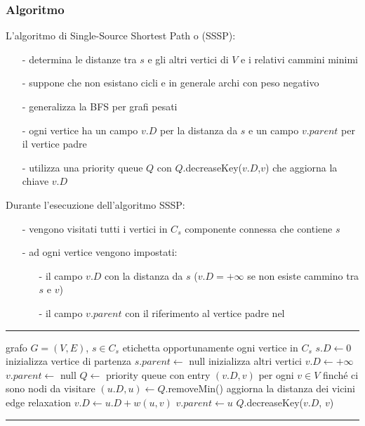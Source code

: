 \documentclass[a4paper]{article}
\makeatletter
\newenvironment{algo}[4]{
	\noindent\rule{\textwidth}{0.4pt}
	\begin{algorithmic}[1]
		\addtocounter{ALG@line}{-1}
		\Procedure{#1}{#2}
		\Require #3
		\Ensure #4
		\Statex }{
		\EndProcedure
	\end{algorithmic}
	\rule{\textwidth}{0.4pt}}
\makeatother
\begin{document}
\subsubsection*{Algoritmo}
L'algoritmo di Single-Source Shortest Path o (SSSP):
\begin{itemize}[topsep=3pt, itemsep=0pt]
	\item[-] determina le distanze tra \(s\) e gli altri vertici di \(V\) e i relativi cammini minimi
	\item[-] suppone che non esistano cicli e in generale archi con peso negativo
	\item[-] generalizza la BFS per grafi pesati
	\item[-] ogni vertice ha un campo \(v.D\) per la distanza da \(s\) e un campo \(v.parent\) per il vertice padre
	\item[-] utilizza una priority queue \(Q\) con \(Q\).decreaseKey(\(v.D\),\(v\)) che aggiorna la chiave \(v.D\)
\end{itemize}
Durante l'esecuzione dell'algoritmo SSSP:
\begin{itemize}[topsep=3pt, itemsep=0pt]
	\item[-] vengono visitati tutti i vertici in \(C_s\) componente connessa che contiene \(s\)
	\item[-] ad ogni vertice vengono impostati:
	\begin{itemize}[topsep=0pt, itemsep=0pt]
		\item[-] il campo \(v.D\) con la distanza da \(s\) (\(v.D = +\infty\) se non esiste cammino tra \(s\) e \(v\))
		\item[-] il campo \(v.parent\) con il riferimento al vertice padre nel 
	\end{itemize}
\end{itemize}

\begin{algo}{ShortestPaths}{$G$,$s$}{grafo $G = (V,E)$, $s \in C_s$}{etichetta opportunamente ogni vertice in \(C_s\)}
	\State \(s.D \gets 0\) \Comment inizializza vertice di partenza
	\State \(s.parent \gets\) null
	 \Comment inizializza altri vertici
		\State \(v.D \gets +\infty\)
		\State \(v.parent \gets\) null
	\EndFor
	\State \(Q \gets\) priority queue con entry \((v.D, v)\) per ogni \(v \in V\)
	 \Comment finché ci sono nodi da visitare
		\State \((u.D, u) \gets Q\).removeMin()
		 \Comment aggiorna la distanza dei vicini
			 \Comment edge relaxation
				\State \(v.D \gets u.D + w(u,v)\)
				\State \(v.parent \gets u\)
				\State \(Q\).decreaseKey(\(v.D\), \(v\))
			\EndIf
		\EndFor
	\EndWhile
\end{algo}
\end{document}
